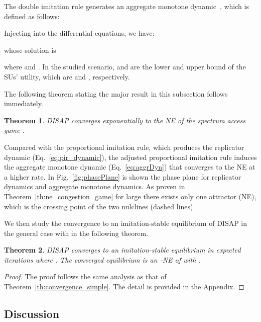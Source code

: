\documentclass[12pt, onecolumn]{IEEEtran}
\theoremstyle{plain}
\newtheorem{theorem}{Theorem}
\theoremstyle{definition}
\begin{document}
The double imitation rule generates an aggregate monotone dynamic~\cite{Schlag99,Sam92}, which is defined as follows:




Injecting  into the differential equations, we have:

whose solution is

where  and
. In the studied scenario,  and  are the lower and upper bound of the SUs' utility, which are  and , respectively.

The following theorem stating the major result in this subsection follows immediately.

\begin{theorem}
DISAP converges exponentially to the NE of the spectrum access game .
\end{theorem}

Compared with the proportional imitation rule, which produces the replicator dynamic (Eq.~\eqref{eq:pir_dynamic}), the adjusted proportional imitation rule induces the aggregate monotone
dynamic (Eq.~\eqref{eq:aggrDyn}) that converges to the NE at a higher rate. In Fig.~\ref{fig:phasePlane} is shown the phase plane for replicator dynamics and aggregate monotone dynamics. As proven in Theorem~\ref{th:ne_congestion_game}
for large  there exists only one attractor (NE), which is the crossing point of the two nulclines (dashed lines).



We then study the convergence to an imitation-stable equilibrium of DISAP in the general case with  in the following theorem.

\begin{theorem}
\label{th:convergence_double}
DISAP converges to an imitation-stable equilibrium in expected  iterations where  . The converged equilibrium is an -NE of  with .
\end{theorem}

\begin{proof}
The proof follows the same analysis as that of Theorem~\ref{th:convergence_simple}. The detail is provided in the Appendix.
\end{proof}

\subsection{Discussion}
\end{document}
